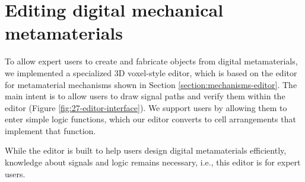 


\section{Editing digital mechanical metamaterials}

To allow expert users to create and fabricate objects from digital metamaterials, we implemented a specialized 3D voxel-style editor, which is based on the editor for metamaterial mechanisms shown in Section \ref{section:mechanisms-editor}. The main intent is to allow users to draw signal paths and verify them within the editor (Figure \ref{fig:27-editor-interface}). We support users by allowing them to enter simple logic functions, which our editor converts to cell arrangements that implement that function.

While the editor is built to help users design digital metamaterials efficiently, knowledge about signals and logic remains necessary, i.e., this editor is for expert users. 

